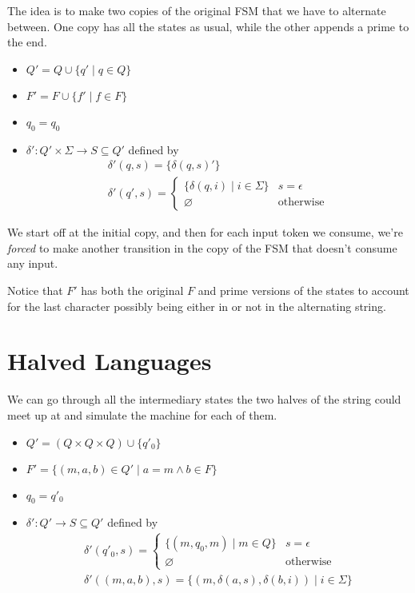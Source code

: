\documentclass[12pt]{article}
\begin{document}
The idea is to make two copies of the original FSM that we have to alternate between.
One copy has all the states as usual, while the other appends a prime to the end.
\begin{itemize}[nolistsep]
    \item $Q'=Q \cup \{q' \mid q \in Q\}$
    \item $F'=F \cup \{f' \mid f \in F\}$
    \item $q_0=q_0$
    \item $\delta': Q' \times \Sigma \rightarrow S \subseteq Q'$ defined by
          \begin{gather*}
              \delta'(q, s)=\{\delta(q, s)'\} \\
              \delta'\left(q', s\right)=\begin{cases}
                  \{\delta(q, i) \mid i \in \Sigma\} & s=\epsilon       \\
                  \varnothing                        & \text{otherwise}
              \end{cases}
          \end{gather*}
\end{itemize}

We start off at the initial copy, and then for each input token we consume,
we're \textit{forced} to make another transition in the copy of the FSM
that doesn't consume any input.

Notice that $F'$ has both the original $F$ and prime versions of the states
to account for the last character possibly being either in or not in
the alternating string.

\pagebreak

\section{Halved Languages}

We can go through all the intermediary states the two halves
of the string could meet up at and simulate the machine for each of them.
\begin{itemize}[nolistsep]
    \item $Q'=(Q \times Q \times Q) \cup \{q'_0\}$
    \item $F'=\{(m, a, b) \in Q' \mid a=m \land b \in F\}$
    \item $q_0=q'_0$
    \item $\delta': Q' \rightarrow S \subseteq Q'$ defined by
          \begin{gather*}
              \delta'(q'_0, s)=\begin{cases}
                  \{(m, q_0, m) \mid m \in Q\} & s=\epsilon       \\
                  \varnothing                  & \text{otherwise}
              \end{cases} \\
              \delta'((m, a, b), s)=\{(m, \delta(a, s), \delta(b, i)) \mid i \in \Sigma\}
          \end{gather*}
\end{itemize}
\end{document}
